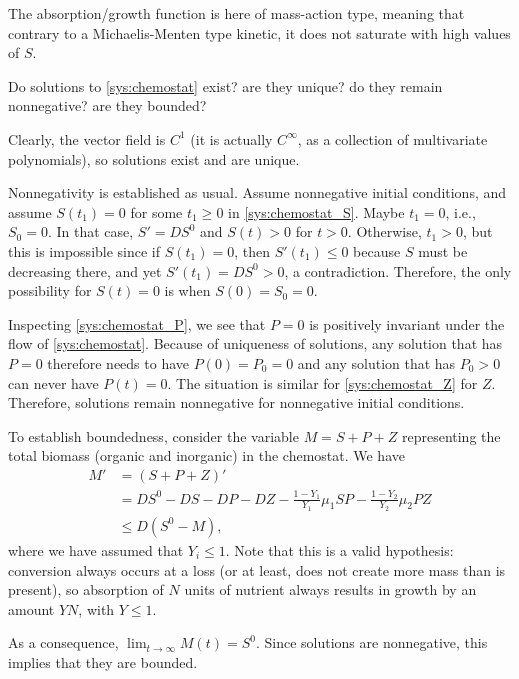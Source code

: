 \documentclass[12pt]{article}
\theoremstyle{plain}
\begin{document}
The absorption/growth function is here of mass-action type, meaning that contrary to a Michaelis-Menten type kinetic, it does not saturate with high values of $S$.

Do solutions to \eqref{sys:chemostat} exist? are they unique? do they remain nonnegative? are they bounded?

Clearly, the vector field is $C^1$ (it is actually $C^\infty$, as a collection of multivariate polynomials), so solutions exist and are unique. 

Nonnegativity is established as usual. Assume nonnegative initial conditions, and assume $S(t_1)=0$ for some $t_1\geq 0$ in \eqref{sys:chemostat_S}. Maybe $t_1=0$, i.e., $S_0=0$. In that case, $S'=DS^0$ and $S(t)>0$ for $t>0$. Otherwise, $t_1>0$, but this is impossible since if $S(t_1)=0$, then $S'(t_1)\leq 0$ because $S$ must be decreasing there, and yet $S'(t_1)=DS^0>0$, a contradiction. Therefore, the only possibility for $S(t)=0$ is when $S(0)=S_0=0$.

Inspecting \eqref{sys:chemostat_P}, we see that $P=0$ is positively invariant under the flow of \eqref{sys:chemostat}. Because of uniqueness of solutions, any solution that has $P=0$ therefore needs to have $P(0)=P_0=0$ and any solution that has $P_0>0$ can never have $P(t)=0$. The situation is similar for \eqref{sys:chemostat_Z} for $Z$.
Therefore, solutions remain nonnegative for nonnegative initial conditions.

To establish boundedness, consider the variable $M=S+P+Z$ representing the total biomass (organic and inorganic) in the chemostat. We have
\begin{align*}
M' &= (S+P+Z)' \\
&= DS^0-DS-DP-DZ-\frac{1-Y_1}{Y_1}\mu_1 SP-\frac{1-Y_2}{Y_2}\mu_2 PZ \\
&\leq D(S^0-M),
\end{align*}
where we have assumed that $Y_i\leq 1$. Note that this is a valid hypothesis: conversion always occurs at a loss (or at least, does not create more mass than is present), so absorption of $N$ units of nutrient always results in growth by an amount $YN$, with $Y\leq 1$.

As a consequence, $\lim_{t\to\infty}M(t)=S^0$. Since solutions are nonnegative, this implies that they are bounded.
\end{document}
